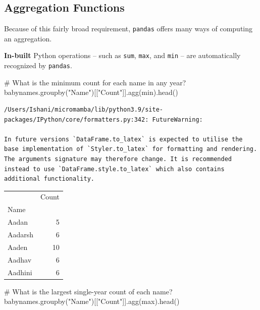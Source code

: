 \documentclass[
  letterpaper,
  DIV=11,
  numbers=noendperiod]{scrreprt}
\newenvironment{Shaded}{\begin{snugshade}}{\end{snugshade}}
\newcommand{\BuiltInTok}[1]{\textcolor[rgb]{0.00,0.23,0.31}{#1}}
\newcommand{\CommentTok}[1]{\textcolor[rgb]{0.37,0.37,0.37}{#1}}
\newcommand{\NormalTok}[1]{\textcolor[rgb]{0.00,0.23,0.31}{#1}}
\newcommand{\StringTok}[1]{\textcolor[rgb]{0.13,0.47,0.30}{#1}}
\begin{document}
\hypertarget{aggregation-functions}{%
\subsection{Aggregation Functions}\label{aggregation-functions}}

Because of this fairly broad requirement, \texttt{pandas} offers many
ways of computing an aggregation.

\textbf{In-built} Python operations -- such as \texttt{sum},
\texttt{max}, and \texttt{min} -- are automatically recognized by
\texttt{pandas}.

\begin{Shaded}
\begin{Highlighting}[]
\CommentTok{\# What is the minimum count for each name in any year?}
\NormalTok{babynames.groupby(}\StringTok{"Name"}\NormalTok{)[[}\StringTok{"Count"}\NormalTok{]].agg(}\BuiltInTok{min}\NormalTok{).head()}
\end{Highlighting}
\end{Shaded}

\begin{verbatim}
/Users/Ishani/micromamba/lib/python3.9/site-packages/IPython/core/formatters.py:342: FutureWarning:

In future versions `DataFrame.to_latex` is expected to utilise the base implementation of `Styler.to_latex` for formatting and rendering. The arguments signature may therefore change. It is recommended instead to use `DataFrame.style.to_latex` which also contains additional functionality.
\end{verbatim}

\begin{tabular}{lr}
\toprule
{} &  Count \\
Name    &        \\
\midrule
Aadan   &      5 \\
Aadarsh &      6 \\
Aaden   &     10 \\
Aadhav  &      6 \\
Aadhini &      6 \\
\bottomrule
\end{tabular}

\begin{Shaded}
\begin{Highlighting}[]
\CommentTok{\# What is the largest single{-}year count of each name?}
\NormalTok{babynames.groupby(}\StringTok{"Name"}\NormalTok{)[[}\StringTok{"Count"}\NormalTok{]].agg(}\BuiltInTok{max}\NormalTok{).head()}
\end{Highlighting}
\end{Shaded}
\end{document}
